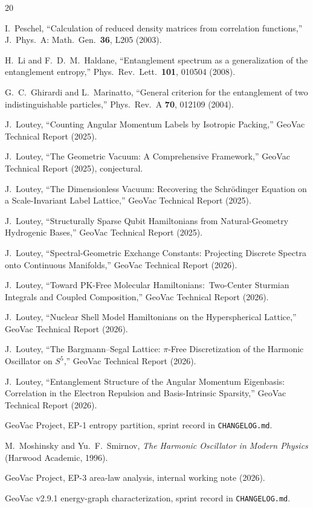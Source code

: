 \documentclass[twocolumn,pra,amsmath,amssymb,superscriptaddress]{revtex4-2}
\begin{document}
\begin{thebibliography}{20}

I.~Peschel,
``Calculation of reduced density matrices from correlation
functions,''
J.\ Phys.\ A: Math.\ Gen.\ \textbf{36}, L205 (2003).

H.~Li and F.~D.~M.~Haldane,
``Entanglement spectrum as a generalization of the entanglement
entropy,''
Phys.\ Rev.\ Lett.\ \textbf{101}, 010504 (2008).

G.~C.~Ghirardi and L.~Marinatto,
``General criterion for the entanglement of two indistinguishable
particles,''
Phys.\ Rev.\ A \textbf{70}, 012109 (2004).

J.~Loutey,
``Counting Angular Momentum Labels by Isotropic Packing,''
GeoVac Technical Report (2025).

J.~Loutey,
``The Geometric Vacuum: A Comprehensive Framework,''
GeoVac Technical Report (2025), conjectural.

J.~Loutey,
``The Dimensionless Vacuum: Recovering the Schr\"odinger Equation on a Scale-Invariant Label Lattice,''
GeoVac Technical Report (2025).

J.~Loutey,
``Structurally Sparse Qubit Hamiltonians from Natural-Geometry Hydrogenic
Bases,''
GeoVac Technical Report (2025).

J.~Loutey,
``Spectral-Geometric Exchange Constants: Projecting Discrete Spectra onto Continuous Manifolds,''
GeoVac Technical Report (2026).

J.~Loutey,
``Toward PK-Free Molecular Hamiltonians:\ Two-Center Sturmian
Integrals and Coupled Composition,''
GeoVac Technical Report (2026).

J.~Loutey,
``Nuclear Shell Model Hamiltonians on the Hyperspherical Lattice,''
GeoVac Technical Report (2026).

J.~Loutey,
``The Bargmann--Segal Lattice: $\pi$-Free Discretization of the Harmonic Oscillator on $S^5$,''
GeoVac Technical Report (2026).

J.~Loutey,
``Entanglement Structure of the Angular Momentum Eigenbasis: Correlation in the Electron Repulsion and Basis-Intrinsic Sparsity,''
GeoVac Technical Report (2026).

GeoVac Project, EP-1 entropy partition, sprint record in \texttt{CHANGELOG.md}.

M.~Moshinsky and Yu.~F.~Smirnov,
\emph{The Harmonic Oscillator in Modern Physics}
(Harwood Academic, 1996).

GeoVac Project, EP-3 area-law analysis, internal working note (2026).

GeoVac v2.9.1 energy-graph characterization, sprint record in \texttt{CHANGELOG.md}.

\end{thebibliography}
\end{document}
